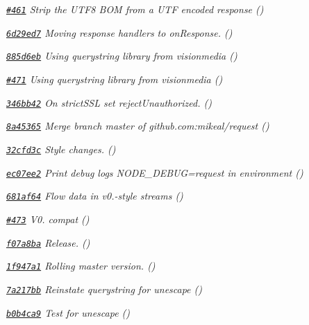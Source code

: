 \begin{DoxyItemize}
\item {\itshape \href{https://github.com/mikeal/request/pull/461}{\tt \#461} Strip the U\+T\+F8 B\+O\+M from a U\+T\+F encoded response ()}
\item {\itshape \href{https://github.com/mikeal/request/commit/6d29ed72e34f3b2b6d8a5cfadd96dd26b3dd246d}{\tt 6d29ed7} Moving response handlers to on\+Response. ()}
\item {\itshape \href{https://github.com/mikeal/request/commit/885d6ebeb6130c2ab7624304f4a01a898573390b}{\tt 885d6eb} Using querystring library from visionmedia ()}
\item {\itshape \href{https://github.com/mikeal/request/pull/471}{\tt \#471} Using querystring library from visionmedia ()}
\item {\itshape \href{https://github.com/mikeal/request/commit/346bb42898c5804576d9e9b3adf40123260bf73b}{\tt 346bb42} On strict\+S\+S\+L set reject\+Unauthorized. ()}
\item {\itshape \href{https://github.com/mikeal/request/commit/8a453656a705d2fa98fbf9092b1600d2ddadbb5a}{\tt 8a45365} Merge branch \textquotesingle{}master\textquotesingle{} of github.\+com\+:mikeal/request ()}
\item {\itshape \href{https://github.com/mikeal/request/commit/32cfd3cf7b3f23c2b1d36c5ccb475cbb3a4693ff}{\tt 32cfd3c} Style changes. ()}
\item {\itshape \href{https://github.com/mikeal/request/commit/ec07ee2d3eeb90b6d0ad9f6d7f3a36da72276841}{\tt ec07ee2} Print debug logs N\+O\+D\+E\+\_\+\+D\+E\+B\+U\+G=request in environment ()}
\item {\itshape \href{https://github.com/mikeal/request/commit/681af644a2ebccad8bcccb75984f7f10f909b382}{\tt 681af64} Flow data in v0.-\/style streams ()}
\item {\itshape \href{https://github.com/mikeal/request/pull/473}{\tt \#473} V0. compat ()}
\item {\itshape \href{https://github.com/mikeal/request/commit/f07a8baebf7001addbc0f7d7c869adddc21768ce}{\tt f07a8ba} Release. ()}
\item {\itshape \href{https://github.com/mikeal/request/commit/1f947a1d2728147fbf4f57aa361d0bedcebfc206}{\tt 1f947a1} Rolling master version. ()}
\item {\itshape \href{https://github.com/mikeal/request/commit/7a217bbdced9a05a786fe6534ab52734df342d3e}{\tt 7a217bb} Reinstate querystring for {\ttfamily unescape} ()}
\item {\itshape \href{https://github.com/mikeal/request/commit/b0b4ca913e119337e9313a157eee2f08f77ddc38}{\tt b0b4ca9} Test for {\ttfamily unescape} ()}

\end{DoxyItemize}
